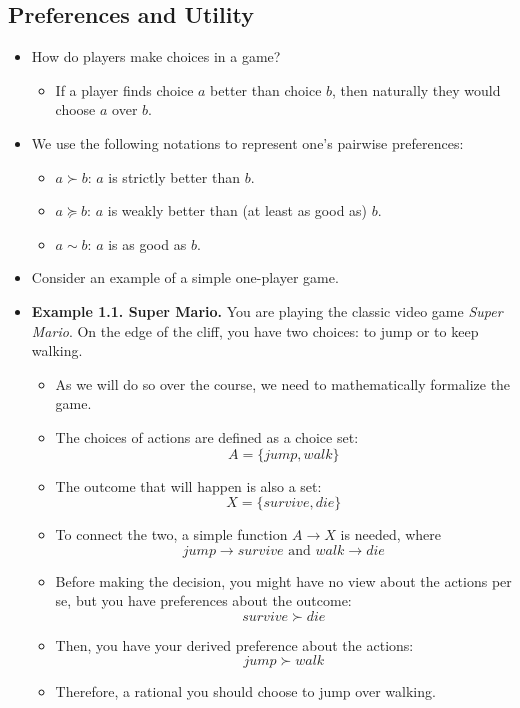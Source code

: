 \documentclass[notitlepage]{article}
\begin{document}
\subsection{Preferences and Utility}

\begin{itemize}
    \item How do players make choices in a game?
    \begin{itemize}
        \item If a player finds choice \(a\) better than choice \(b\), then naturally they would choose \(a\) over \(b\).
    \end{itemize}
    \item We use the following notations to represent one's pairwise preferences:
    \begin{itemize}
        \item \(a \succ b\): \(a\) is strictly better than \(b\).
        \item \(a \succeq b\): \(a\) is weakly better than (at least as good as) \(b\).
        \item \(a \sim b\): \(a\) is as good as \(b\).
    \end{itemize}
    \item Consider an example of a simple one-player game.
    \item \textbf{Example 1.1. Super Mario.} You are playing the classic video game \textit{Super Mario}. On the edge of the cliff, you have two choices: to jump or to keep walking.
    \begin{itemize}
        \item As we will do so over the course, we need to mathematically formalize the game.
        \item The choices of actions are defined as a choice set: \[A = \{jump, walk\}\]
        \item The outcome that will happen is also a set: \[X = \{survive, die\}\]
        \item To connect the two, a simple function \(A \to X\) is needed, where \[jump \to survive \text{ and } walk \to die\]
        \item Before making the decision, you might have no view about the actions per se, but you have preferences about the outcome: \[survive \succ die\]
        \item Then, you have your derived preference about the actions: \[jump \succ walk\]
        \item Therefore, a rational you should choose to jump over walking.

\end{itemize}
\end{itemize}
\end{document}
